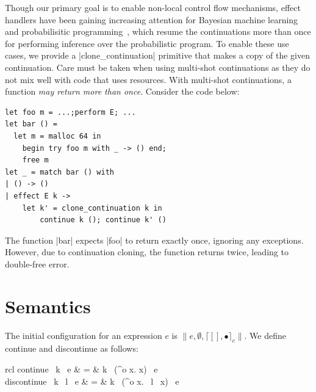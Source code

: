 \documentclass[sigplan,10pt,review,anonymous]{acmart}\settopmatter{printfolios=true,printccs=false,printacmref=false}
\newenvironment{nop}{}{}
\newenvironment{smathpar}{
\begin{nop}\small\begin{mathpar}}{
\end{mathpar}\end{nop}\ignorespacesafterend}
\newcommand{\olam}[2]{\lambda^o #1. #2}
\newcommand{\kw}[1]{\text{\bf #1}}
\newcommand{\throw}[2]{\kw{raise} ~#1 ~#2}
\newcommand{\cstacka}[2]{\big \lceil #1, #2 \big \rceil_c} %
\newcommand{\configa}[3]{\|#1,#2,#3\|}
\begin{document}
Though our primary goal is to enable non-local control flow mechanisms, effect
handlers have been gaining increasing attention for Bayesian machine learning
and probabilisitic programming~\cite{PyroJMLR,MooreEdward2Google}, which resume
the continuations more than once for performing inference over the
probabilistic program. To enable these use cases, we provide a
|clone_continuation| primitive that makes a copy of the given continuation.
Care must be taken when using multi-shot continuations as they do not mix well
with code that uses resources. With multi-shot continuations, a function
\emph{may return more than once}. Consider the code below:

\begin{lstlisting}
let foo m = ...;perform E; ...
let bar () =
  let m = malloc 64 in
	begin try foo m with _ -> () end;
	free m
let _ = match bar () with
| () -> ()
| effect E k ->
    let k' = clone_continuation k in
		continue k (); continue k' ()
\end{lstlisting}

The function |bar| expects |foo| to return exactly once, ignoring any exceptions. However,
due to continuation cloning, the function returns twice, leading to double-free
error.
\fi

\section{Semantics}
\label{sec:semantics}

The initial configuration for an expression $e$ is
$\configa{e}{\emptyset}{\cstacka{[]}{\bullet}}$. We define {\sf continue} and
{\sf discontinue} as follows:

\begin{smathpar}
	\begin{array}{rcl}
		\textsf{continue} ~k ~e & = & k ~(\olam{x}{x}) ~e \\
		\textsf{discontinue} ~k ~l ~e & = & k ~(\olam{x}{\throw{l}{x}}) ~e
	\end{array}
\end{smathpar}
\end{document}
